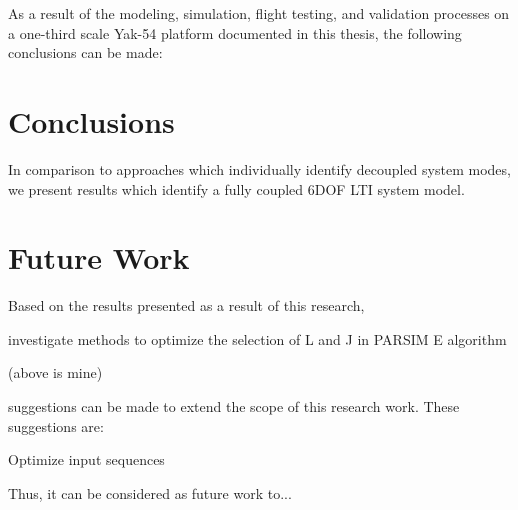 As a result of the modeling, simulation, flight testing, and validation processes on a one-third scale Yak-54 platform documented in this thesis, the following conclusions can be made:

\section{Conclusions}

In comparison to approaches which individually identify decoupled system modes, we present results which identify a fully coupled 6DOF LTI system model.


\section{Future Work}
Based on the results presented as a result of this research, 

investigate methods to optimize the selection of L and J in PARSIM E algorithm


(above is mine)





suggestions can be made to extend the scope of this research work. These suggestions are:


Optimize input sequences

Thus, it can be considered as future work to...